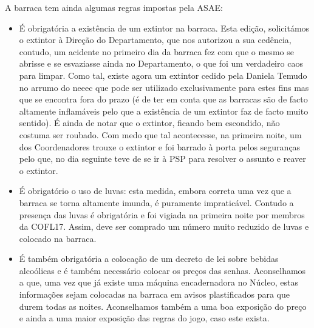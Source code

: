 A barraca tem ainda algumas regras impostas pela ASAE:
\begin{itemize}
    \item É obrigatória a existência de um extintor na barraca. Esta edição, solicitámos o extintor à Direção do Departamento, que nos autorizou a sua cedência, contudo, um acidente no primeiro dia da barraca fez com que o mesmo se abrisse e se esvaziasse ainda no Departamento, o que foi um verdadeiro caos para limpar. Como tal, existe agora um extintor cedido pela Daniela Temudo no arrumo do \acrshort{neeec} que pode ser utilizado exclusivamente para estes fins mas que se encontra fora do prazo (é de ter em conta que as barracas são de facto altamente inflamáveis pelo que a existência de um extintor faz de facto muito sentido). É ainda de notar que o extintor, ficando bem escondido, não costuma ser roubado. Com medo que tal acontecesse, na primeira noite, um dos Coordenadores trouxe o extintor e foi barrado à porta pelos seguranças pelo que, no dia seguinte teve de se ir à PSP para resolver o assunto e reaver o extintor.
    \item É obrigatório o uso de luvas: esta medida, embora correta uma vez que a barraca se torna altamente imunda, é puramente impraticável. Contudo a presença das luvas é obrigatória e foi vigiada na primeira noite por membros da COFL17. Assim, deve ser comprado um número muito reduzido de luvas e colocado na barraca.
    \item É também obrigatória a colocação de um decreto de lei sobre bebidas alcoólicas e é também necessário colocar os preços das senhas. Aconselhamos a que, uma vez que já existe uma máquina encadernadora no Núcleo, estas informações sejam colocadas na barraca em avisos plastificados para que durem todas as noites. Aconselhamos também a uma boa exposição do preço e ainda a uma maior exposição das regras do jogo, caso este exista.
\end{itemize}

